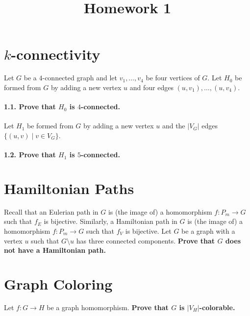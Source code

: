 \documentclass{article}
\title{Homework 1}
\author{}
\begin{document}
  \maketitle

  \section{$k$-connectivity}
    Let $G$ be a $4$-connected graph and let $v_1,\ldots, v_4$ be four vertices of $G$.
    Let $H_0$ be formed from $G$ by adding a new vertex $u$ and four edges $(u,v_1), \ldots , (u,v_4)$.
    \\\\
    \textbf{1.1. Prove that $H_0$ is $4$-connected.}
    \\\\
    Let $H_1$ be formed from $G$ by adding a new vertex $u$ and the $|V_G|$ edges $\{(u,v) \mid v\in V_G\}$.
    \\\\
    \textbf{1.2. Prove that $H_1$ is $5$-connected.}


  \section{Hamiltonian Paths}
  Recall that an Eulerian path in $G$ is (the image of) a homomorphism $f:P_m\to G$ such that $f_E$ is bijective.
  Similarly, a Hamiltonian path in $G$ is (the image of) a homomorphism $f:P_m\to G$ such that $f_V$ is bijective.
  Let $G$ be a graph with a vertex $u$ such that $G\setminus u$ has three connected components.
  \textbf{Prove that $G$ does not have a Hamiltonian path.}

  \section{Graph Coloring}
    Let $f:G\to H$ be a graph homomorphism.
    \textbf{Prove that $G$ is $|V_H|$-colorable.}

    
\end{document}

